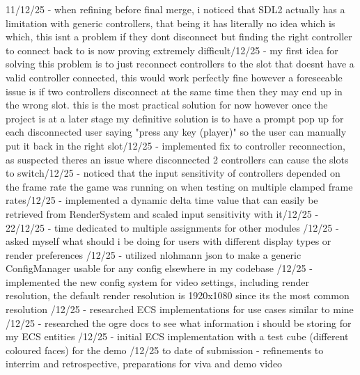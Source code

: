 \documentclass[]{final_report}
\begin{document}
11/12/25 - when refining before final merge, i noticed that SDL2 actually has a limitation with generic controllers, that being it has literally no idea which is which, this isnt a problem if they dont disconnect but finding the right controller to connect back to is now proving extremely difficult/12/25 - my first idea for solving this problem is to just reconnect controllers to the slot that doesnt have a valid controller connected, this would work perfectly fine however a foreseeable issue is if two controllers disconnect at the same time then they may end up in the wrong slot. this is the most practical solution for now however once the project is at a later stage my definitive solution is to have a prompt pop up for each disconnected user saying "press any key (player)" so the user can manually put it back in the right slot/12/25 - implemented fix to controller reconnection, as suspected theres an issue where disconnected 2 controllers can cause the slots to switch/12/25 - noticed that the input sensitivity of controllers depended on the frame rate the game was running on when testing on multiple clamped frame rates/12/25 - implemented a dynamic delta time value that can easily be retrieved from RenderSystem and scaled input sensitivity with it/12/25 - 22/12/25 - time dedicated to multiple assignments for other modules /12/25 - asked myself what should i be doing for users with different display types or render preferences /12/25 - utilized nlohmann json to make a generic ConfigManager usable for any config elsewhere in my codebase /12/25 - implemented the new config system for video settings, including render resolution, the default render resolution is 1920x1080 since its the most common resolution /12/25 - researched ECS implementations for use cases similar to mine /12/25 - researched the ogre docs to see what information i should be storing for my ECS entities /12/25 - initial ECS implementation with a test cube (different coloured faces) for the demo /12/25 to date of submission - refinements to interrim and retrospective, preparations for viva and demo video
\end{document}

